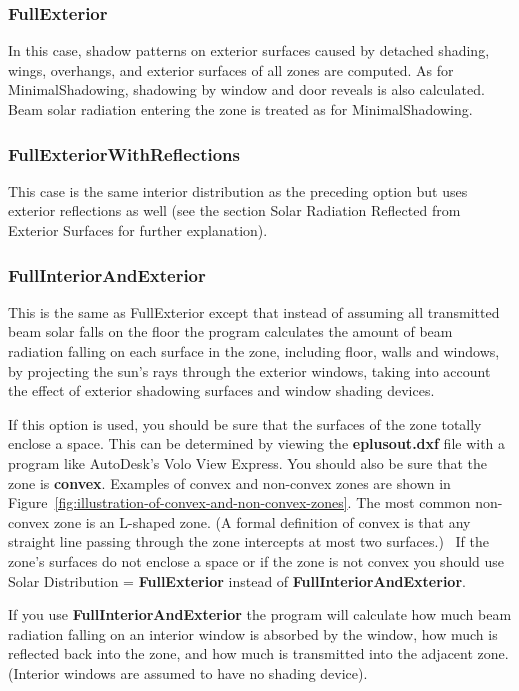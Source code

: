 \subsubsection{FullExterior}\label{fullexterior}

In this case, shadow patterns on exterior surfaces caused by detached shading, wings, overhangs, and exterior surfaces of all zones are computed. As for MinimalShadowing, shadowing by window and door reveals is also calculated. Beam solar radiation entering the zone is treated as for MinimalShadowing.

\subsubsection{FullExteriorWithReflections}\label{fullexteriorwithreflections}

This case is the same interior distribution as the preceding option but uses exterior reflections as well (see the section Solar Radiation Reflected from Exterior Surfaces for further explanation).

\subsubsection{FullInteriorAndExterior}\label{fullinteriorandexterior}

This is the same as FullExterior except that instead of assuming all transmitted beam solar falls on the floor the program calculates the amount of beam radiation falling on each surface in the zone, including floor, walls and windows, by projecting the sun's rays through the exterior windows, taking into account the effect of exterior shadowing surfaces and window shading devices.

If this option is used, you should be sure that the surfaces of the zone totally enclose a space. This can be determined by viewing the \textbf{eplusout.dxf} file with a program like AutoDesk's Volo View Express. You should also be sure that the zone is \textbf{convex}. Examples of convex and non-convex zones are shown in Figure~\ref{fig:illustration-of-convex-and-non-convex-zones}. The most common non-convex zone is an L-shaped zone. (A formal definition of convex is that any straight line passing through the zone intercepts at most two surfaces.)~ If the zone's surfaces do not enclose a space or if the zone is not convex you should use Solar Distribution = \textbf{FullExterior} instead of \textbf{FullInteriorAndExterior}.

If you use \textbf{FullInteriorAndExterior} the program will calculate how much beam radiation falling on an interior window is absorbed by the window, how much is reflected back into the zone, and how much is transmitted into the adjacent zone. (Interior windows are assumed to have no shading device).

